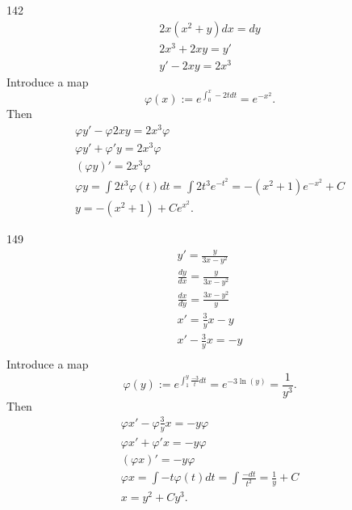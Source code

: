 \documentclass[12pt,a4paper]{article}
\begin{document}
    \begin{problem}{142}
        \begin{gather*}
            2x(x^2 + y)dx = dy\\
            2x^3 + 2xy = y'\\
            y' - 2xy = 2x^3
        \end{gather*}
        Introduce a map
        \[\varphi(x) := e^{\int_0^x -2t dt} = e^{-x^2}.\]
        Then
        \begin{gather*}
            \varphi y' - \varphi 2xy = 2x^3 \varphi\\
            \varphi y' + \varphi' y = 2x^3 \varphi\\
            (\varphi y)' = 2x^3 \varphi\\
            \varphi y = \int 2t^3 \varphi(t) dt = \int 2t^3 e^{-t^2} = -(x^2 + 1)e^{-x^2} + C\\
            y = -(x^2 + 1) + C e^{x^2}.
        \end{gather*}
    \end{problem}

    \begin{problem}{149}
        \begin{gather*}
            y' = \frac{y}{3x - y^2}\\
            \frac{dy}{dx} = \frac{y}{3x - y^2}\\
            \frac{dx}{dy} = \frac{3x - y^2}{y}\\
            x' = \frac{3}{y} x - y\\
            x' - \frac{3}{y} x = -y\\
        \end{gather*}
        Introduce a map
        \[\varphi(y) := e^{\int_1^y \frac{-3}{t} dt} = e^{-3\ln(y)} = \frac{1}{y^3}.\]
        Then
        \begin{gather*}
            \varphi x' - \varphi \frac{3}{y} x = -y \varphi\\
            \varphi x' + \varphi' x = -y \varphi\\
            (\varphi x)' = -y \varphi\\
            \varphi x = \int -t \varphi(t) dt = \int \frac{-dt}{t^2} = \frac{1}{y} + C\\
            x = y^2 + C y^3.
        \end{gather*}
    \end{problem}
\end{document}
